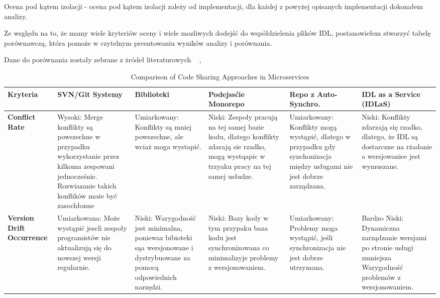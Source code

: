 \documentclass[runningheads,12pt]{llncs}
\begin{document}
Ocena pod kątem izolacji - ocena pod kątem izolacji zależy od implementacji, dla każdej z powyżej opisanych implementacji dokonałem analizy.

Ze wsględu na to, że mamy wiele kryteriów oceny i wiele mozliwych dodejść do współdzielenia plików IDL, postanowiełem stworzyć tabelę porównawczą, która pomoże w czytelnym preentowaniu wyników analizy i porównania.

Dane do porównania zostały zebrane z żródeł literaturowych ~\cite{newman2015building} ,  ~\cite{kleppmann2017designing}

\begin{table}[htbp]
    \centering
    \caption{Comparison of Code Sharing Approaches in Microservices}
    \label{tab:comparison}
    \begin{tabularx}{\textwidth}{|>{\raggedright\arraybackslash}X|>{\raggedright\arraybackslash}X|>{\raggedright\arraybackslash}X|>{\raggedright\arraybackslash}X|>{\raggedright\arraybackslash}X|>{\raggedright\arraybackslash}X|}
    \hline
    \textbf{Kryteria} & \textbf{SVN/Git Systemy} & \textbf{Biblioteki} & \textbf{Podejssćie Monorepo} & \textbf{Repo z Auto-Synchro.} & \textbf{IDL as a Service (IDLaS)} \\
    \hline
    \textbf{Conflict Rate} &
    Wysoki: Merge konflikty są powszechne w przypadku wykorzystanie przez kilkoma zespowani jednocześnie. Rozwiazanie takich konflików może być zasochłonne &
    Umiarkowany: Konflikty są mniej powszechne, ale wciaż moga wystapić. &
    Niski: Zespoły pracują na tej samej bazie kodu, dlatego konflikty zdarają sie rzadko, mogą wystqapic w trzyaku pracy na tej samej usłudze. &
    Umiarkowany: Konflikty mogą wystąpić, dlatego w przypadku gdy synchonizacja między usługami nie jest dobrze zarządzana. &
    Niski: Konflikty zdarzają się rzadko, dlatego, że IDL są dostarczne na rżadanie a wersjowaniee jest wymuszane. \\
    \hline
    \textbf{Version Drift Occurrence} &
    Umiarkowana: Może wystąpić jescli zespoły programistów nie aktualizują się do nowszej wersji regularnie. &
    Niski: Warygodność jest minimalna, poniewaz bibioteki sąa wersjonowane i dystrybuowane za pomocą odpowiednich narzędzi. &
    Niski: Bazy kody w tym przypaku baza kodu jest synchronizowana co minimalizyje problemy z wersjonowaniem. &
    Umiarkowany: Problemy moga wystąpić, jeśli synchronizacja nie jest dobrze utrzymana. &
    Bardzo Niski: Dynamiczna zarządzanie wersjami po stronie usługi zmniejsza Warygodność problemów z wersjonowaniem. \\

\end{tabularx}
\end{table}
\end{document}
